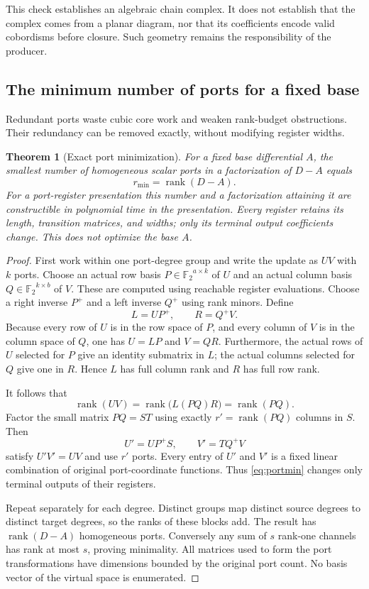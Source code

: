 \documentclass[11pt,letterpaper]{article}
\newcommand{\F}{{\mathbb F_2}}
\newcommand{\rk}{\operatorname{rank}}
\newtheorem{theorem}{Theorem}[section]
\theoremstyle{definition}
\theoremstyle{remark}
\numberwithin{equation}{section}
\begin{document}
This check establishes an algebraic chain complex. It does not establish
that the complex comes from a planar diagram, nor that its coefficients
encode valid cobordisms before closure. Such geometry remains the
responsibility of the producer.

\subsection{The minimum number of ports for a fixed base}
Redundant ports waste cubic core work and weaken rank-budget obstructions.
Their redundancy can be removed exactly, without modifying register widths.

\begin{theorem}[Exact port minimization]
\label{thm:minimize}
For a fixed base differential $A$, the smallest number of homogeneous
scalar ports in a factorization of $D-A$ equals
\begin{equation}
 r_{\min}=\rk(D-A).
 \label{eq:rmin}
\end{equation}
For a port-register presentation this number and a factorization attaining
it are constructible in polynomial time in the presentation. Every
register retains its length, transition matrices, and widths; only its
terminal output coefficients change. This does not optimize the base $A$.
\end{theorem}
\begin{proof}
First work within one port-degree group and write the update as $UV$ with
$k$ ports. Choose an actual row basis $P\in\F^{a\times k}$ of $U$ and
an actual column basis $Q\in\F^{k\times b}$ of $V$. These are computed
using reachable register evaluations. Choose a right inverse $P^+$ and
a left inverse $Q^+$ using rank minors. Define
\[
 L=UP^+,\qquad R=Q^+V.
\]
Because every row of $U$ is in the row space of $P$, and every column of
$V$ is in the column space of $Q$, one has $U=LP$ and $V=QR$.
Furthermore, the actual rows of $U$ selected for $P$ give an identity
submatrix in $L$; the actual columns selected for $Q$ give one in $R$.
Hence $L$ has full column rank and $R$ has full row rank.

It follows that
\[
 \rk(UV)=\rk\bigl(L(PQ)R\bigr)=\rk(PQ).
\]
Factor the small matrix $PQ=ST$ using exactly $r'=\rk(PQ)$ columns in
$S$. Then
\begin{equation}
 U'=UP^+S,\qquad V'=TQ^+V
 \label{eq:portmin}
\end{equation}
satisfy $U'V'=UV$ and use $r'$ ports. Every entry of $U'$ and $V'$ is a
fixed linear combination of original port-coordinate functions. Thus
\eqref{eq:portmin} changes only terminal outputs of their registers.

Repeat separately for each degree. Distinct groups map distinct source
degrees to distinct target degrees, so the ranks of these blocks add.
The result has $\rk(D-A)$ homogeneous ports. Conversely any sum of $s$
rank-one channels has rank at most $s$, proving minimality. All matrices
used to form the port transformations have dimensions bounded by the
original port count. No basis vector of the virtual space is enumerated.
\end{proof}
\end{document}
